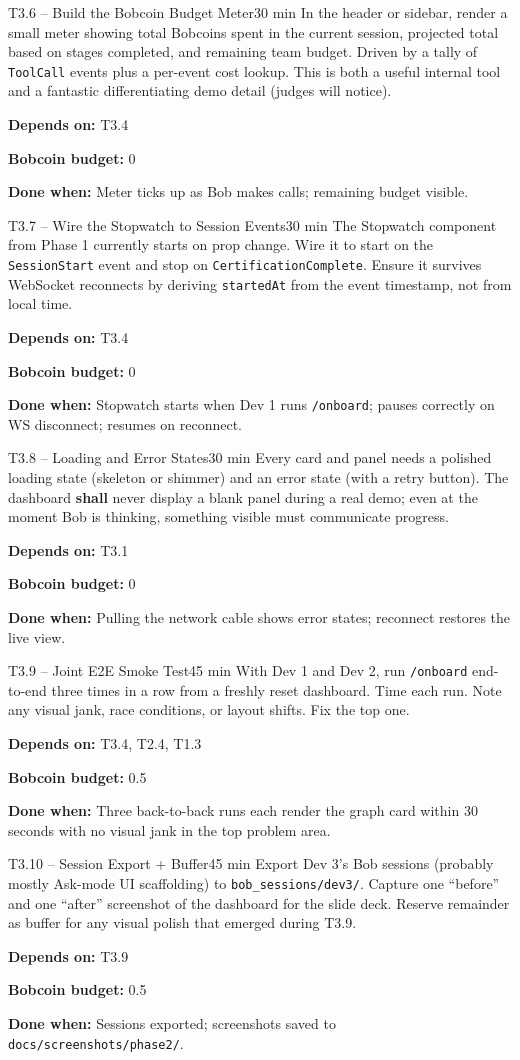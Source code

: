 \documentclass[11pt,letterpaper]{article}
\newcommand{\acceptance}[1]{\par\smallskip\textcolor{ibmgreen}{\textbf{Done when:}} #1}
\newcommand{\depends}[1]{\par\smallskip\textcolor{ibmorange}{\textbf{Depends on:}} #1}
\newcommand{\bobcost}[1]{\par\smallskip\textcolor{ibmaccent}{\textbf{Bobcoin budget:}} #1}
\newcommand{\shall}{\textbf{shall}}
\begin{document}
\begin{task}{T3.6 -- Build the Bobcoin Budget Meter}{30 min}
In the header or sidebar, render a small meter showing total Bobcoins spent in the current session, projected total based on stages completed, and remaining team budget. Driven by a tally of \texttt{ToolCall} events plus a per-event cost lookup. This is both a useful internal tool and a fantastic differentiating demo detail (judges will notice).
\depends{T3.4}
\bobcost{0}
\acceptance{Meter ticks up as Bob makes calls; remaining budget visible.}
\end{task}

\begin{task}{T3.7 -- Wire the Stopwatch to Session Events}{30 min}
The Stopwatch component from Phase 1 currently starts on prop change. Wire it to start on the \texttt{SessionStart} event and stop on \texttt{CertificationComplete}. Ensure it survives WebSocket reconnects by deriving \texttt{startedAt} from the event timestamp, not from local time.
\depends{T3.4}
\bobcost{0}
\acceptance{Stopwatch starts when Dev 1 runs \texttt{/onboard}; pauses correctly on WS disconnect; resumes on reconnect.}
\end{task}

\begin{task}{T3.8 -- Loading and Error States}{30 min}
Every card and panel needs a polished loading state (skeleton or shimmer) and an error state (with a retry button). The dashboard \shall{} never display a blank panel during a real demo; even at the moment Bob is thinking, something visible must communicate progress.
\depends{T3.1}
\bobcost{0}
\acceptance{Pulling the network cable shows error states; reconnect restores the live view.}
\end{task}

\begin{task}{T3.9 -- Joint E2E Smoke Test}{45 min}
With Dev 1 and Dev 2, run \texttt{/onboard} end-to-end three times in a row from a freshly reset dashboard. Time each run. Note any visual jank, race conditions, or layout shifts. Fix the top one.
\depends{T3.4, T2.4, T1.3}
\bobcost{0.5}
\acceptance{Three back-to-back runs each render the graph card within 30 seconds with no visual jank in the top problem area.}
\end{task}

\begin{task}{T3.10 -- Session Export + Buffer}{45 min}
Export Dev 3's Bob sessions (probably mostly Ask-mode UI scaffolding) to \texttt{bob\_sessions/dev3/}. Capture one ``before'' and one ``after'' screenshot of the dashboard for the slide deck. Reserve remainder as buffer for any visual polish that emerged during T3.9.
\depends{T3.9}
\bobcost{0.5}
\acceptance{Sessions exported; screenshots saved to \texttt{docs/screenshots/phase2/}.}
\end{task}
\end{document}
